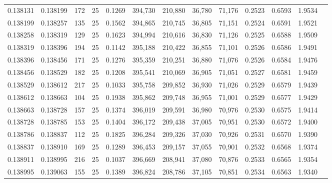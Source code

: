 \begin{tabular}{rrrrrrrrrrrrr}
0.138131 & 0.138199 &   172 &  25 &                                     0.1269 & 394,730 & 210,880 &  36,780 &  71,176 & 0.2523 & 0.6593 & 1.9534 \\
0.138199 & 0.138257 &   135 &  25 &                                     0.1562 & 394,865 & 210,745 &  36,805 &  71,151 & 0.2524 & 0.6591 & 1.9521 \\
0.138258 & 0.138319 &   129 &  25 &                                     0.1623 & 394,994 & 210,616 &  36,830 &  71,126 & 0.2525 & 0.6588 & 1.9509 \\
0.138319 & 0.138396 &   194 &  25 &                                     0.1142 & 395,188 & 210,422 &  36,855 &  71,101 & 0.2526 & 0.6586 & 1.9491 \\
0.138396 & 0.138456 &   171 &  25 &                                     0.1276 & 395,359 & 210,251 &  36,880 &  71,076 & 0.2526 & 0.6584 & 1.9476 \\
0.138456 & 0.138529 &   182 &  25 &                                     0.1208 & 395,541 & 210,069 &  36,905 &  71,051 & 0.2527 & 0.6581 & 1.9459 \\
0.138529 & 0.138612 &   217 &  25 &                                     0.1033 & 395,758 & 209,852 &  36,930 &  71,026 & 0.2529 & 0.6579 & 1.9439 \\
0.138612 & 0.138663 &   104 &  25 &                                     0.1938 & 395,862 & 209,748 &  36,955 &  71,001 & 0.2529 & 0.6577 & 1.9429 \\
0.138663 & 0.138728 &   157 &  25 &                                     0.1374 & 396,019 & 209,591 &  36,980 &  70,976 & 0.2530 & 0.6575 & 1.9414 \\
0.138728 & 0.138785 &   153 &  25 &                                     0.1404 & 396,172 & 209,438 &  37,005 &  70,951 & 0.2530 & 0.6572 & 1.9400 \\
0.138786 & 0.138837 &   112 &  25 &                                     0.1825 & 396,284 & 209,326 &  37,030 &  70,926 & 0.2531 & 0.6570 & 1.9390 \\
0.138837 & 0.138910 &   169 &  25 &                                     0.1289 & 396,453 & 209,157 &  37,055 &  70,901 & 0.2532 & 0.6568 & 1.9374 \\
0.138911 & 0.138995 &   216 &  25 &                                     0.1037 & 396,669 & 208,941 &  37,080 &  70,876 & 0.2533 & 0.6565 & 1.9354 \\
0.138995 & 0.139063 &   155 &  25 &                                     0.1389 & 396,824 & 208,786 &  37,105 &  70,851 & 0.2534 & 0.6563 & 1.9340 \\

\end{tabular}
